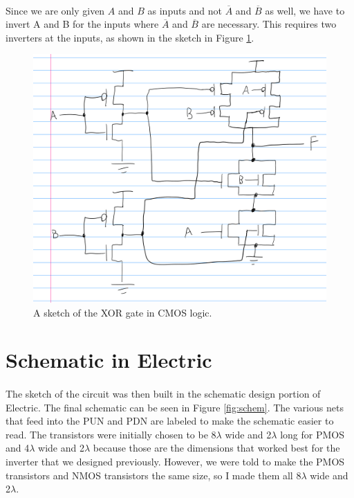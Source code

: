 \documentclass{article}
\begin{document}
  \paragraph{}
  Since we are only given $A$ and $B$ as inputs and not $\overline{A}$ and $\overline{B}$ as well, we have to invert A and B for the inputs where $\overline{A}$ and $\overline{B}$ are necessary. This requires two inverters at the inputs, as shown in the sketch in Figure \ref{fig:sketch2}.


  \begin{figure}[H]
    \centering
    \includegraphics[width=0.7\linewidth, frame]{screenshots/schematic-sketch-2.png}
    \caption{A sketch of the XOR gate in CMOS logic.}
    \label{fig:sketch2}
  \end{figure}

\section{Schematic in Electric}

  \paragraph{}
  The sketch of the circuit was then built in the schematic design portion of Electric. The final schematic can be seen in Figure \ref{fig:schem}. The various nets that feed into the PUN and PDN are labeled to make the schematic easier to read. The transistors were initially chosen to be 8$\lambda$ wide and 2$\lambda$ long for PMOS and 4$\lambda$ wide and 2$\lambda$ because those are the dimensions that worked best for the inverter that we designed previously. However, we were told to make the PMOS transistors and NMOS transistors the same size, so I made them all 8$\lambda$ wide and 2$\lambda$.
\end{document}
